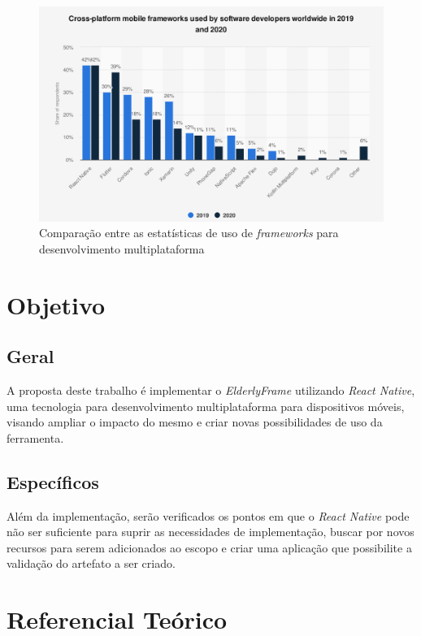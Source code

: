 \documentclass[
	12pt,				    %
	openright,			    %
	oneside,			    %
	a4paper,			    %
    sumario=tradicional,    %
	english,			    %
	brazil,				    %
	]{abntex2}              %
\begin{document}
\begin{figure}[H]
	\begin{center}
		\includegraphics[height=.5\linewidth]{images/mobile-frameworks-statista.png}
	\end{center}
	\caption[Comparativo de uso de frameworks para desenvolvimento multiplataforma]{Comparação entre as estatísticas de uso de \textit{frameworks} para desenvolvimento multiplataforma}
	\label{fig:statistaResearch}
\end{figure}

\chapter{Objetivo}\label{sec:objetivos}

\section{Geral}

A proposta deste trabalho é implementar o \emph{ElderlyFrame} utilizando \emph{React Native}, uma tecnologia para desenvolvimento multiplataforma para dispositivos móveis, visando ampliar o impacto do mesmo e criar novas possibilidades de uso da ferramenta.

\section{Específicos}

Além da implementação, serão verificados os pontos em que o \emph{React Native} pode não ser suficiente para suprir as necessidades de implementação, buscar por novos recursos para serem adicionados ao escopo e criar uma aplicação que possibilite a validação do artefato a ser criado.


\chapter{Referencial Teórico}\label{sec:referencialTeorico}
\end{document}
